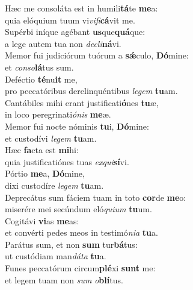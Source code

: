 \evenverse Hæc me consoláta est in humili\textbf{tá}te \textbf{me}a:~\*\\
\evenverse quia elóquium tuum vi\textit{vi}\textit{fi}\textbf{cá}vit me.\\
\oddverse Supérbi iníque agébant \textbf{us}que\textbf{quá}que:~\*\\
\oddverse a lege autem tua non \textit{de}\textit{cli}\textbf{ná}vi.\\
\evenverse Memor fui judiciórum tuórum a \textbf{sǽ}culo, \textbf{Dó}mine:~\*\\
\evenverse et \textit{con}\textit{so}\textbf{lá}tus sum.\\
\oddverse Deféctio \textbf{té}nu\textbf{it} me,~\*\\
\oddverse pro peccatóribus derelinquéntibus \textit{le}\textit{gem} \textbf{tu}am.\\
\evenverse Cantábiles mihi erant justificati\textbf{ó}nes \textbf{tu}æ,~\*\\
\evenverse in loco peregrinati\textit{ó}\textit{nis} \textbf{me}æ.\\
\oddverse Memor fui nocte nóminis \textbf{tu}i, \textbf{Dó}mine:~\*\\
\oddverse et custodívi \textit{le}\textit{gem} \textbf{tu}am.\\
\evenverse Hæc \textbf{fa}cta est \textbf{mi}hi:~\*\\
\evenverse quia justificatiónes tuas \textit{ex}\textit{qui}\textbf{sí}vi.\\
\oddverse Pórtio \textbf{me}a, \textbf{Dó}mine,~\*\\
\oddverse dixi custodíre \textit{le}\textit{gem} \textbf{tu}am.\\
\evenverse Deprecátus sum fáciem tuam in toto \textbf{cor}de \textbf{me}o:~\*\\
\evenverse miserére mei secúndum eló\textit{qui}\textit{um} \textbf{tu}um.\\
\oddverse Cogitávi \textbf{vi}as \textbf{me}as:~\*\\
\oddverse et convérti pedes meos in testimó\textit{ni}\textit{a} \textbf{tu}a.\\
\evenverse Parátus sum, et non \textbf{sum} tur\textbf{bá}tus:~\*\\
\evenverse ut custódiam man\textit{dá}\textit{ta} \textbf{tu}a.\\
\oddverse Funes peccatórum circum\textbf{plé}xi \textbf{sunt} me:~\*\\
\oddverse et legem tuam non \textit{sum} \textit{o}\textbf{blí}tus.\\
